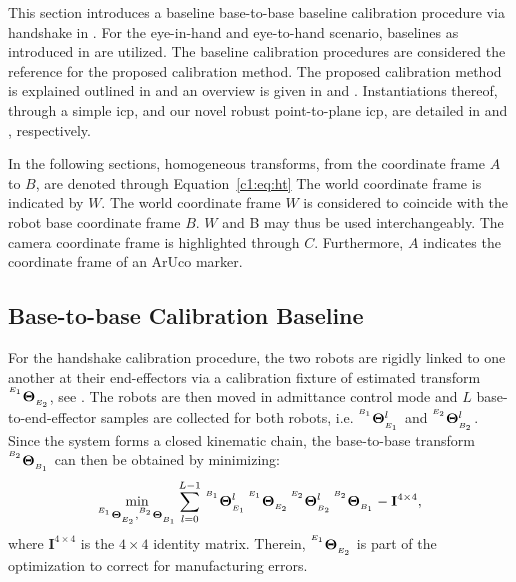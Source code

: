 This section introduces a baseline base-to-base baseline calibration procedure via handshake in . For the eye-in-hand and eye-to-hand scenario, baselines as introduced in  are utilized. The baseline calibration procedures are considered the reference for the proposed calibration method. The proposed calibration method is explained outlined in  and an overview is given in  and . Instantiations thereof, through a simple \gls{icp}, and our novel robust point-to-plane \gls{icp}, are detailed in  and , respectively.

In the following sections, homogeneous transforms, from the coordinate frame $A$ to $B$, are denoted through Equation~\ref{c1:eq:ht}
The world coordinate frame is indicated by $W$. The world coordinate frame $W$ is considered to coincide with the robot base coordinate frame $B$. $W$ and B may thus be used interchangeably. The camera coordinate frame is highlighted through $C$. Furthermore, $A$ indicates the coordinate frame of an ArUco marker.

\subsection{Base-to-base Calibration Baseline}
\label{c1:sec:handshake_calibration}
For the handshake calibration procedure, the two robots are rigidly linked to one another at their end-effectors via a calibration fixture of estimated transform ${}^{^{E_1}}\mathbf{\Theta}_{_{E_2}}$, see . The robots are then moved in admittance control mode and $L$ base-to-end-effector samples are collected for both robots, i.e. ${}^{^{B_1}}\mathbf{\Theta}_{_{E_1}}^l$ and ${}^{^{E_2}}\mathbf{\Theta}_{_{B_2}}^l$. Since the system forms a closed kinematic chain, the base-to-base transform ${}^{^{B_2}}\mathbf{\Theta}_{_{B_1}}$ can then be obtained by minimizing:
%
\begin{equation}
    \label{c1:eq:handsake}
    \min_{{}^{^{E_1}}\mathbf{\Theta}_{_{E_2}}, {}^{^{B_2}}\mathbf{\Theta}_{_{B_1}}} \sum_{l=0}^{L-1}\,{}^{^{B_1}}\mathbf{\Theta}_{_{E_1}}^l\,{}^{^{E_1}}\mathbf{\Theta}_{_{E_2}}\,{}^{^{E_2}}\mathbf{\Theta}_{_{B_2}}^l\,{}^{^{B_2}}\mathbf{\Theta}_{_{B_1}} - \mathbf{I}^{4\times4},
\end{equation}
%
where $\mathbf{I}^{4\times4}$ is the $4\times4$ identity matrix. Therein, ${}^{^{E_1}}\mathbf{\Theta}_{_{E_2}}$ is part of the optimization to correct for manufacturing errors.

